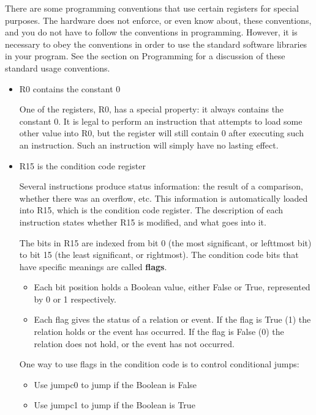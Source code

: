 \documentclass[11pt]{article}
\begin{document}
There are some programming conventions that use certain registers for
special purposes.  The hardware does not enforce, or even know about,
these conventions, and you do not have to follow the conventions in
programming.  However, it is necessary to obey the conventions in
order to use the standard software libraries in your program.  See the
section on Programming for a discussion of these standard usage
conventions.

\begin{itemize}
\item R0 contains the constant 0
\label{sec:orgd46b073}

One of the registers, R0, has a special property: it always contains
the constant 0.  It is legal to perform an instruction that attempts
to load some other value into R0, but the register will still contain
0 after executing such an instruction.  Such an instruction will
simply have no lasting effect.

\item R15 is the condition code register
\label{sec:orgc10709e}

Several instructions produce status information: the result of a
comparison, whether there was an overflow, etc.  This information is
automatically loaded into R15, which is the condition code register.
The description of each instruction states whether R15 is modified,
and what goes into it.

The bits in R15 are indexed from bit 0 (the most significant, or
lefttmost bit) to bit 15 (the least significant, or rightmost).  The
condition code bits that have specific meanings are called \textbf{flags}.

\begin{itemize}
\item Each bit position holds a Boolean value, either False or True,
represented by 0 or 1 respectively.
\item Each flag gives the status of a relation or event.  If the flag is
True (1) the relation holds or the event has occurred.  If the flag
is False (0) the relation does not hold, or the event has not
occurred.
\end{itemize}

One way to use flags in the condition code is to control conditional
jumps:
\begin{itemize}
\item Use jumpc0 to jump if the Boolean is False
\item Use jumpc1 to jump if the Boolean is True
\end{itemize}


\end{itemize}
\end{document}
